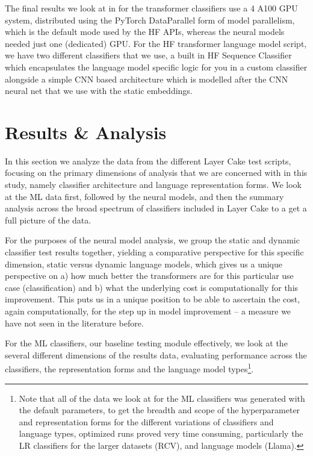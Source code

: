 \documentclass[final]{clv2025}
\begin{document}
The final results we look at in for the transformer classifiers use a 4 A100 GPU system, distributed using the PyTorch DataParallel form of model parallelism, which is the default mode used by the HF APIs, whereas the neural models needed just one (dedicated) GPU. For the HF transformer language model script, we have two different classifiers that we use, a built in HF Sequence Classifier which encapsulates the language model specific logic for you in a custom classifier alongside a simple CNN based architecture which is modelled after the CNN neural net that we use with the static embeddings.

\section{Results \& Analysis}
In this section we analyze the data from the different Layer Cake test scripts, focusing on the primary dimensions of analysis that we are concerned with in this study, namely classifier architecture and language representation forms. We look at the ML data first, followed by the neural models, and then the summary analysis across the broad spectrum of classifiers included in Layer Cake to a get a full picture of the data. 

For the purposes of the neural model analysis, we group the static and dynamic classifier test results together, yielding a comparative perspective for this specific dimension, static versus dynamic language models, which gives us a unique perspective on a) how much better the transformers are for this particular use case (classification) and b) what the underlying cost is computationally for this improvement. This puts us in a unique position to be able to ascertain the cost, again computationally, for the step up in model improvement – a measure we have not seen in the literature before.

For the ML classifiers, our baseline testing module effectively, we look at the several different dimensions of the results data, evaluating performance across the classifiers, the representation forms and the language model types\footnote{  Note that all of the data we look at for the ML classifiers was generated with the default parameters, to get the breadth and scope of the hyperparameter and representation forms for the different variations of classifiers and language types, optimized runs proved very time consuming, particularly the LR classifiers for the larger datasets (RCV), and language models (Llama).}. 
\end{document}
